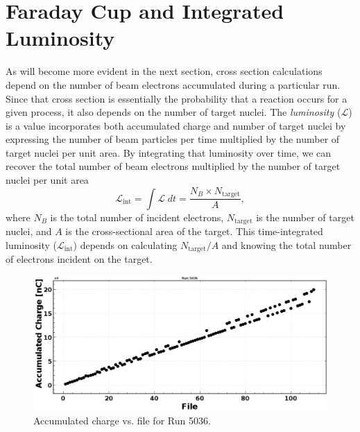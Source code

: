 \section{Faraday Cup and Integrated Luminosity}
As will become more evident in the next section, cross section calculations depend on the number of beam electrons accumulated during a particular run. Since that cross section is essentially the probability that a reaction occurs for a given process, it also depends on the number of target nuclei. The \textit{luminosity} ($\mathscr{L}$) is a value incorporates both accumulated charge and number of target nuclei by expressing the number of beam particles per time multiplied by the number of target nuclei per unit area. By integrating that luminosity over time, we can recover the total number of beam electrons multiplied by the number of target nuclei per unit area
\begin{equation}
\mathscr{L_{\mathrm{int}}} = \int \mathscr{L} \; dt = \frac{N_{B} \times N_{\mathrm{target}}}{A},
\end{equation}
where $N_{B}$ is the total number of incident electrons, $N_{\mathrm{target}}$ is the number of target nuclei, and $A$ is the cross-sectional area of the target. This time-integrated luminosity ($\mathscr{L}_{\mathrm{int}}$) depends on calculating $N_{\mathrm{target}}/A$ and knowing the total number of electrons incident on the target.

\begin{figure}[h!]
	\centering
	\includegraphics[width=0.9\linewidth]{figures/rga/charge.png}
	\caption{Accumulated charge vs. file for Run 5036.}
	\label{fig:rga_charge}
\end{figure}

